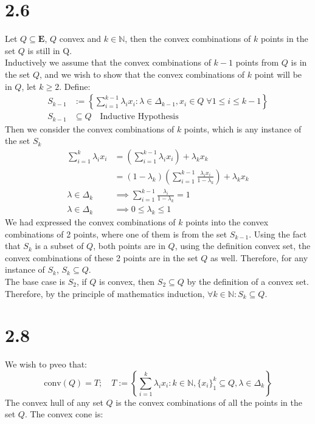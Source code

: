 \documentclass[]{article}
\begin{document}
\section*{2.6}
    Let $Q \subseteq \mathbf{E}$, $Q$ convex and $k \in \mathbb{N}$, then the convex combinations of $k$ points in the set $Q$ is still in Q. 
    \\[1.1em]
    Inductively we assume that the convex combinations of $k - 1$ points from $Q$ is in the set $Q$, and we wish to show that the convex combinations of $k$ point will be in $Q$, let $k \ge 2$. Define: 
    \begin{align*}\tag{2.6.1}\label{eqn:2.6.1}
        S_{k -1} &:= \left\lbrace
            \sum_{i = 1}^{k - 1}\lambda_ix_i: \lambda \in \Delta_{k - 1}, x_i \in Q \;\forall 1 \le i \le k -1
        \right\rbrace
        \\
        S_{k - 1} &\subseteq Q \quad \text{Inductive Hypothesis}
    \end{align*}
    Then we consider the convex combinations of $k$ points, which is any instance of the set $S_k$
    \begin{align*}\tag{2.6.2}\label{eqn:2.6.2}
        \sum_{i =1}^{k} \lambda_ix_i &= \left(
            \sum_{i = 1}^{k - 1} \lambda_i x_i
        \right) + \lambda_k x_k
        \\
        &= (1 - \lambda_k)\left(
            \sum_{i = 1}^{k - 1} \frac{\lambda_i x_i}{1 - \lambda_k}
        \right) + \lambda_k x_k 
        \\
        \lambda \in \Delta_k &\implies
        \sum_{i = 1}^{k - 1} \frac{\lambda_i}{1 - \lambda_k} = 1
        \\
        \lambda \in \Delta_k &\implies 0 \le \lambda_k \le 1 
    \end{align*}
    We had expressed the convex combinations of $k$ points into the convex combinations of 2 points, where one of them is from the set $S_{k - 1}$. Using the fact that $S_k$ is a subset of $Q$, both points are in $Q$, using the definition convex set, the convex combinations of these 2 points are in the set $Q$ as well. Therefore, for any instance of $S_k$, $S_k\subseteq Q$. 
    \\[1.1em]
    The base case is $S_2$, if $Q$ is convex, then $S_2 \subseteq Q$  by the definition of a convex set. Therefore, by the principle of mathematics induction, $\forall k \in \mathbb{N}: S_k \subseteq Q$. 
\section*{2.8}
    We wish to pveo that: 
    $$
        \text{conv}(Q) = T; \quad T := \left\lbrace
            \sum_{ i = 1}^{k} \lambda_i x_i: k \in \mathbb{N}, \{x_i\}_{1}^k \subseteq Q, \lambda \in \Delta_k
        \right\rbrace
    $$
    The convex hull of any set $Q$ is the convex combinations of all the points in the set $Q$. The convex cone is: 
\end{document}
